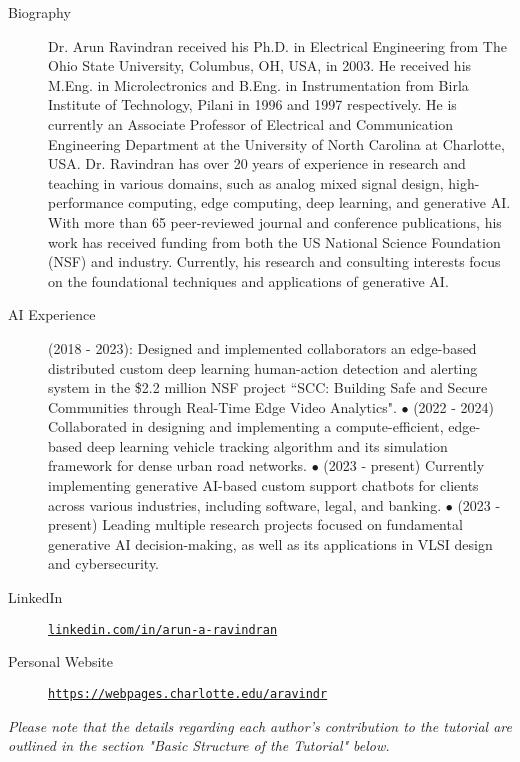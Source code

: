 \documentclass[12pt]{article}
\begin{document}
\begin{description}

    \item[Biography] Dr. Arun Ravindran received his Ph.D. in Electrical Engineering from The Ohio State University, Columbus, OH, USA, in 2003. He received his M.Eng. in Microlectronics and B.Eng. in Instrumentation from Birla Institute of Technology, Pilani in 1996 and 1997 respectively. He is currently an Associate Professor of Electrical and Communication Engineering Department at the University of North Carolina at Charlotte, USA. 
    Dr. Ravindran has over 20 years of experience in research and teaching in various domains, such as analog mixed signal design, high-performance computing, edge computing, deep learning, and generative AI. With more than 65 peer-reviewed journal and conference publications, his work has received funding from both the US National Science Foundation (NSF) and industry. Currently, his research and consulting interests focus on the foundational techniques and applications of generative AI.

    \item[AI Experience] (2018 - 2023): Designed and implemented collaborators an edge-based distributed custom deep learning human-action detection and alerting system in the \$2.2 million NSF project ``SCC: Building Safe and Secure Communities through Real-Time Edge Video Analytics". $\bullet$ (2022 - 2024) Collaborated in designing and implementing a compute-efficient, edge-based deep learning vehicle tracking algorithm and its simulation framework for dense urban road networks. $\bullet$ (2023 - present) Currently implementing generative AI-based custom support chatbots for clients across various industries, including software, legal, and banking. $\bullet$ (2023 - present) Leading multiple research projects focused on fundamental generative AI decision-making, as well as its applications in VLSI design and cybersecurity.

    \item[LinkedIn] \href{https://www.linkedin.com/in/arun-a-ravindran/}{\texttt{linkedin.com/in/arun-a-ravindran}}

    \item[Personal Website]  \href{https://webpages.charlotte.edu/aravindr/}{\texttt{https://webpages.charlotte.edu/aravindr}}



\end{description}

\textit{Please note that the details regarding each author's contribution to the tutorial are outlined in the section "Basic Structure of the Tutorial" below.} 
\end{document}
